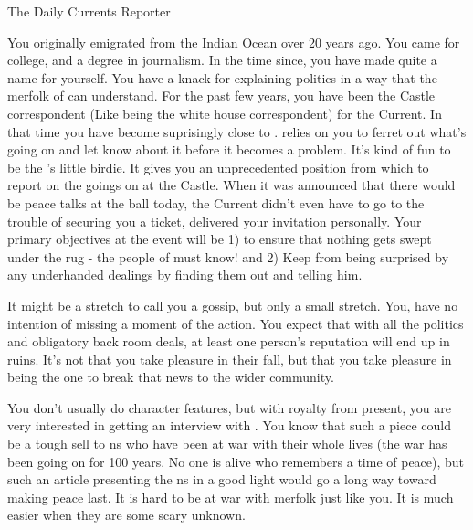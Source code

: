 \documentclass[char]{NeptuneBall}
\begin{document}
\name{\cReporter{}}


The Daily Currents Reporter

You originally emigrated from the Indian Ocean over 20 years ago. You came for college, and a degree in journalism. In the time since, you have made quite a name for yourself. You have a knack for explaining politics in a way that the merfolk of \pAtlantis{} can understand. For the past few years, you have been the Castle correspondent (Like being the white house correspondent) for the Current. In that time you have become suprisingly close to \cKing{\King} \cKing{}. \cKing{\They} relies on you to ferret out what's going on and let \cKing{\them} know about it before it becomes a problem. It's kind of fun to be the \cKing{\Monarch}'s little birdie. It gives you an unprecedented position from which to report on the goings on at the Castle. When it was announced that there would be peace talks at the ball today, the Current didn't even have to go to the trouble of securing you a ticket, \cKing{\King} \cKing{} delivered your invitation personally.  Your primary objectives at the event will be 1) to ensure that nothing gets swept under the rug - the people of \pAtlantis{} must know! and 2) Keep \cKing{\King} \cKing{} from being surprised by any underhanded dealings by finding them out and telling him. 

It might be a stretch to call you a gossip, but only a small stretch. You, have no intention of missing a moment of the action. You expect that with all the politics and obligatory back room deals, at least one person’s reputation will end up in ruins. It's not that you take pleasure in their fall, but that you take pleasure in being the one to break that news to the wider community.

You don't usually do character features, but with royalty from \pPacifica{} present, you are very interested in getting an interview with \cPrince{\them}. You know that such a piece could be a tough sell to \pAtlantis{}ns who have been at war with \pPacifica{} their whole lives (the war has been going on for 100 years. No one is alive who remembers a time of peace), but such an article presenting the \pPacifica{}ns in a good light would go a long way toward making peace last. It is hard to be at war with merfolk just like you. It is much easier when they are some scary unknown.
\end{document}
